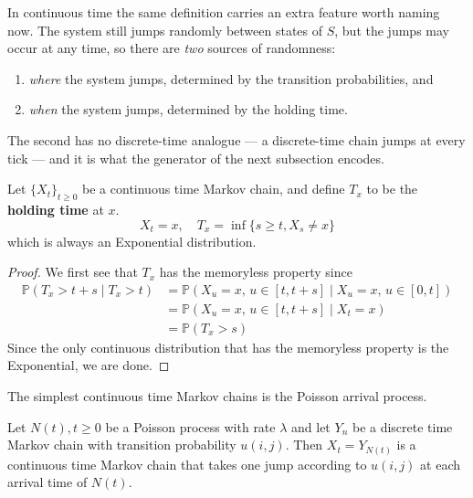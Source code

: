 	In continuous time the same definition carries an extra feature worth naming now. The system still jumps randomly between states of $S$, but the jumps may occur at any time, so there are \textit{two} sources of randomness:
	\begin{enumerate}
		\item \textit{where} the system jumps, determined by the transition probabilities, and
		\item \textit{when} the system jumps, determined by the holding time.
	\end{enumerate}
	The second has no discrete-time analogue --- a discrete-time chain jumps at every tick --- and it is what the generator of the next subsection encodes. 

	\begin{definition}
		\label{def:holding-time}
		Let $\{X_t\}_{t \geq 0}$ be a continuous time Markov chain, and define $T_x$ to be the \textbf{holding time} at $x$. 
		\begin{equation}
			X_t = x, \quad T_x = \inf\{s \geq t, X_s \neq x\}
		\end{equation}
		which is always an Exponential distribution. 
	\end{definition}
	\begin{proof}
	  We first see that $T_x$ has the memoryless property since 
		\begin{align}
			\mathbb{P}(T_x > t + s \mid T_x > t) 
				& = \mathbb{P}(X_u = x, \, u \in [t, t + s] \mid X_u = x, \, u \in [0, t]) \\
				& = \mathbb{P}(X_u = x, \, u \in [t, t + s] \mid X_t = x) \\
				& = \mathbb{P}(T_x > s) 
		\end{align}
		Since the only continuous distribution that has the memoryless property is the Exponential, we are done. 
	\end{proof}

  \begin{example}
    \label{ex:poisson-arrival-process}
		The simplest continuous time Markov chains is the Poisson arrival process. 
  \end{example}

  \begin{example}
    \label{ex:markov-chain-with-continuous-jumps}
    Let $N(t), t \geq 0$ be a Poisson process with rate $\lambda$ and let $Y_n$ be a discrete time Markov chain with transition probability $u(i, j)$. Then $X_t = Y_{N(t)}$ is a continuous time Markov chain that takes one jump according to $u(i, j)$ at each arrival time of $N(t)$.
  \end{example}

